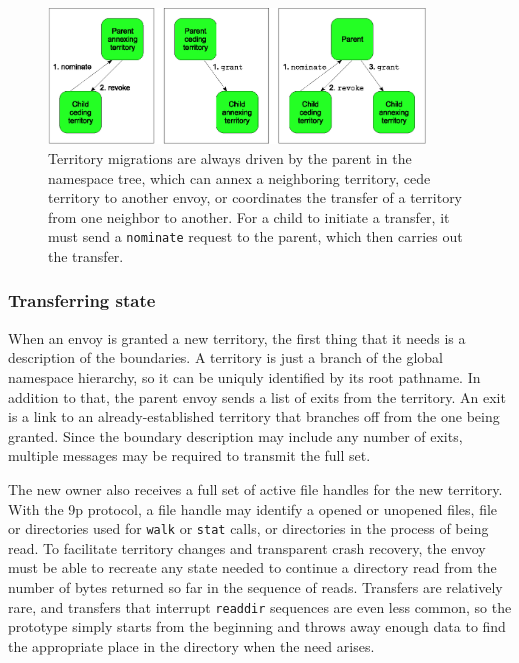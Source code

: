 \begin{figure}[tp]
\centering
\includegraphics[width=100mm]{figures/grant-topdown}
\caption{Territory migrations are always driven by the parent in the namespace tree, which can annex a neighboring territory, cede territory to another envoy, or coordinates the transfer of a territory from one neighbor to another. For a child to initiate a transfer, it must send a \texttt{nominate} request to the parent, which then carries out the transfer.}
\label{fig:grant-topdown}
\end{figure}

\subsubsection{Transferring state}

When an envoy is granted a new territory, the first thing that it needs is a description of the boundaries. A territory is just a branch of the global namespace hierarchy, so it can be uniquly identified by its root pathname. In addition to that, the parent envoy sends a list of exits from the territory. An exit is a link to an already-established territory that branches off from the one being granted. Since the boundary description may include any number of exits, multiple messages may be required to transmit the full set.

The new owner also receives a full set of active file handles for the new territory. With the 9p protocol, a file handle may identify a opened or unopened files, file or directories used for \texttt{walk} or \texttt{stat} calls, or directories in the process of being read. To facilitate territory changes and transparent crash recovery, the envoy must be able to recreate any state needed to continue a directory read from the number of bytes returned so far in the sequence of reads. Transfers are relatively rare, and transfers that interrupt \texttt{readdir} sequences are even less common, so the prototype simply starts from the beginning and throws away enough data to find the appropriate place in the directory when the need arises.

